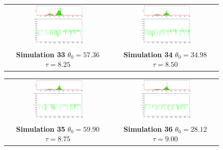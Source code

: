 \begin{figure}\label{fig: SimulationMetropolisHasting4}
\begin{tabular}{cc} 
\includegraphics[width=0.5\textwidth]{ImaginiLatex/MetropolisExample33.eps} &
\includegraphics[width=0.5\textwidth]{ImaginiLatex/MetropolisExample34.eps} \\
\textbf{Simulation 33} $\theta_0=   57.36$  $\tau=    8.25$  & \textbf{Simulation 34} $\theta_0=   34.98$  $\tau=    8.50$
\end{tabular}
\begin{tabular}{cc} 
\includegraphics[width=0.5\textwidth]{ImaginiLatex/MetropolisExample35.eps} &
\includegraphics[width=0.5\textwidth]{ImaginiLatex/MetropolisExample36.eps} \\
\textbf{Simulation 35} $\theta_0=   59.90$  $\tau=    8.75$  & \textbf{Simulation 36} $\theta_0=   28.12$  $\tau=    9.00$
\end{tabular}
\end{figure}
